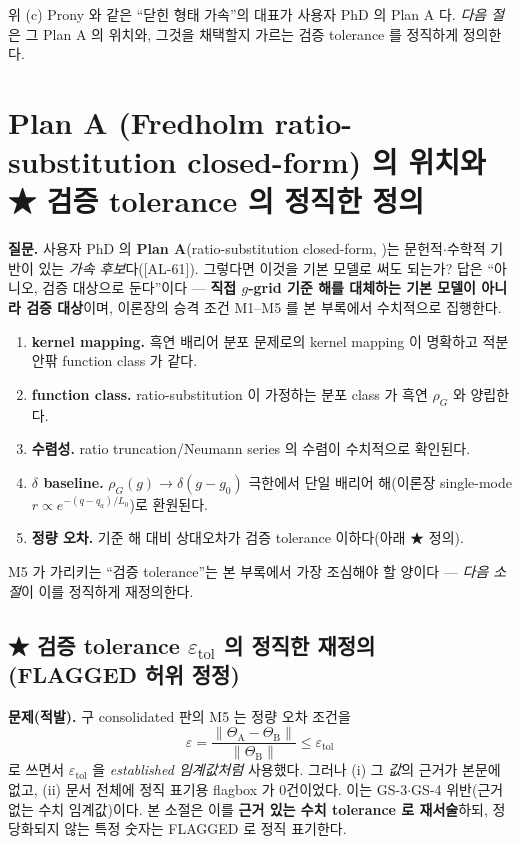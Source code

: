 \documentclass[11pt,a4paper]{article}
\newcommand{\tol}{\mathrm{tol}}
\newcommand{\AL}[1]{\textsf{[AL-#1]}}
\begin{document}
위 (c) Prony 와 같은 ``닫힌 형태 가속''의 대표가 사용자 PhD 의 Plan A 다. \emph{다음 절}은 그 Plan A 의 위치와,
그것을 채택할지 가르는 검증 tolerance 를 정직하게 정의한다.

\section{Plan A (Fredholm ratio-substitution closed-form) 의 위치와 ★ 검증 tolerance 의 정직한 정의}\label{sec:ch6_closure}
\textbf{질문.} 사용자 PhD 의 \textbf{Plan A}(ratio-substitution closed-form, \cite{lee2011,son2013,jcp2017})는
문헌적$\cdot$수학적 기반이 있는 \emph{가속 후보}다(\AL{61}). 그렇다면 이것을 기본 모델로 써도 되는가? 답은 ``아니오,
검증 대상으로 둔다''이다 — \textbf{직접 $g$-grid 기준 해를 대체하는 기본 모델이 아니라 검증 대상}이며, 이론장의
승격 조건 M1--M5 를 본 부록에서 수치적으로 집행한다.
\begin{enumerate}[label=M\arabic*),leftmargin=2.4em]
\item \textbf{kernel mapping.} 흑연 배리어 분포 문제로의 kernel mapping 이 명확하고 적분 안팎 function class 가 같다.
\item \textbf{function class.} ratio-substitution 이 가정하는 분포 class 가 흑연 $\rho_G$ 와 양립한다.
\item \textbf{수렴성.} ratio truncation/Neumann series 의 수렴이 수치적으로 확인된다.
\item \textbf{$\delta$ baseline.} $\rho_G(g)\to\delta(g-g_0)$ 극한에서 단일 배리어 해(이론장 single-mode
  $r\propto e^{-(q-q_a)/L_0}$)로 환원된다.
\item \textbf{정량 오차.} 기준 해 대비 상대오차가 검증 tolerance 이하다(아래 ★ 정의).
\end{enumerate}
M5 가 가리키는 ``검증 tolerance''는 본 부록에서 가장 조심해야 할 양이다 — \emph{다음 소절}이 이를 정직하게
재정의한다.

\subsection{★ 검증 tolerance $\varepsilon_\tol$ 의 정직한 재정의 (FLAGGED 허위 정정)}\label{sec:ch6_epsilon}
\textbf{문제(적발).} 구 consolidated 판의 M5 는 정량 오차 조건을
\[
\varepsilon=\frac{\lVert\Theta_{\mathrm A}-\Theta_{\mathrm B}\rVert}{\lVert\Theta_{\mathrm B}\rVert}\le\varepsilon_\tol
\]
로 쓰면서 $\varepsilon_\tol$ 을 \emph{established 임계값처럼} 사용했다. 그러나 (i) 그 \emph{값}의 근거가 본문에
없고, (ii) 문서 전체에 정직 표기용 flagbox 가 0건이었다. 이는 GS-3$\cdot$GS-4 위반(근거 없는 수치 임계값)이다.
본 소절은 이를 \textbf{근거 있는 수치 tolerance 로 재서술}하되, 정당화되지 않는 특정 숫자는 FLAGGED 로 정직 표기한다.
\end{document}
